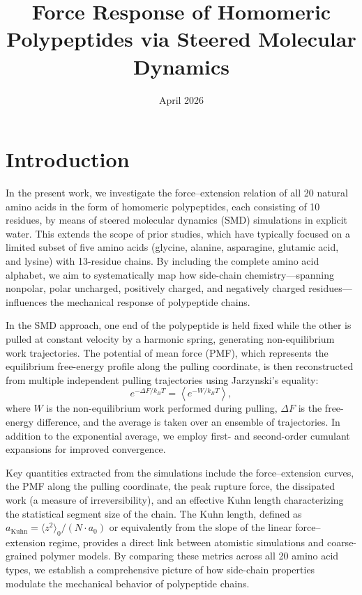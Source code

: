 \documentclass[12pt]{article}
\title{Force Response of Homomeric Polypeptides via Steered Molecular Dynamics}
\author{}
\date{April 2026}
\begin{document}
\maketitle

\section{Introduction}

In the present work, we investigate the force--extension relation of all 20 natural amino acids in the form of homomeric polypeptides, each consisting of 10 residues, by means of steered molecular dynamics (SMD) simulations in explicit water. This extends the scope of prior studies, which have typically focused on a limited subset of five amino acids (glycine, alanine, asparagine, glutamic acid, and lysine) with 13-residue chains. By including the complete amino acid alphabet, we aim to systematically map how side-chain chemistry---spanning nonpolar, polar uncharged, positively charged, and negatively charged residues---influences the mechanical response of polypeptide chains.

In the SMD approach, one end of the polypeptide is held fixed while the other is pulled at constant velocity by a harmonic spring, generating non-equilibrium work trajectories. The potential of mean force (PMF), which represents the equilibrium free-energy profile along the pulling coordinate, is then reconstructed from multiple independent pulling trajectories using Jarzynski's equality:
\begin{equation}
    e^{-\Delta F / k_B T} = \left\langle e^{-W / k_B T} \right\rangle,
    \label{eq:jarzynski}
\end{equation}
where $W$ is the non-equilibrium work performed during pulling, $\Delta F$ is the free-energy difference, and the average is taken over an ensemble of trajectories. In addition to the exponential average, we employ first- and second-order cumulant expansions for improved convergence.

Key quantities extracted from the simulations include the force--extension curves, the PMF along the pulling coordinate, the peak rupture force, the dissipated work (a measure of irreversibility), and an effective Kuhn length characterizing the statistical segment size of the chain. The Kuhn length, defined as $a_\mathrm{Kuhn} = \langle z^2 \rangle_0 / (N \cdot a_0)$ or equivalently from the slope of the linear force--extension regime, provides a direct link between atomistic simulations and coarse-grained polymer models. By comparing these metrics across all 20 amino acid types, we establish a comprehensive picture of how side-chain properties modulate the mechanical behavior of polypeptide chains.
\end{document}
